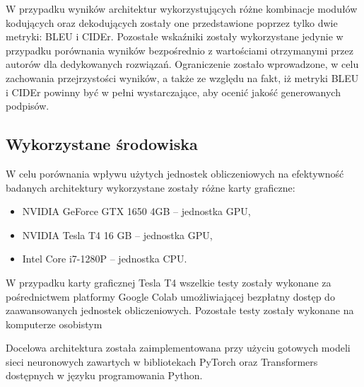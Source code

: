 W przypadku wyników architektur wykorzystujących różne kombinacje modułów kodujących oraz dekodujących zostały one przedstawione poprzez tylko dwie metryki: BLEU i CIDEr. Pozostałe wskaźniki zostały wykorzystane jedynie w przypadku porównania wyników bezpośrednio z wartościami otrzymanymi przez autorów dla dedykowanych rozwiązań. Ograniczenie zostało wprowadzone, w celu zachowania przejrzystości wyników, a także ze względu na fakt, iż metryki BLEU i CIDEr powinny być w pełni wystarczające, aby ocenić jakość generowanych podpisów.
\subsection{Wykorzystane środowiska}
W celu porównania wpływu użytych jednostek obliczeniowych na efektywność badanych architektury wykorzystane zostały różne karty graficzne:
\begin{itemize}
    \item NVIDIA GeForce GTX 1650 4GB -- jednostka GPU,
    \item NVIDIA Tesla T4 16 GB -- jednostka GPU,
    \item Intel Core i7-1280P -- jednostka CPU.
\end{itemize}
W przypadku karty graficznej Tesla T4 wszelkie testy zostały wykonane za pośrednictwem platformy Google Colab umożliwiającej bezpłatny dostęp do zaawansowanych jednostek obliczeniowych. Pozostałe testy zostały wykonane na komputerze osobistym

Docelowa architektura została zaimplementowana przy użyciu gotowych modeli sieci neuronowych zawartych w bibliotekach PyTorch \cite{pytorch} oraz Transformers \cite{wolf-etal-2020-transformers} dostępnych w języku programowania Python.

